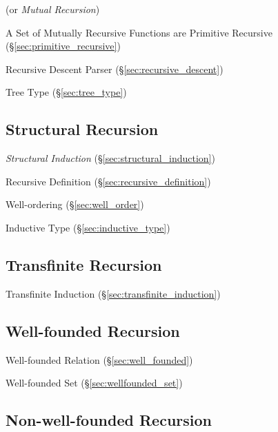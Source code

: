 (or \emph{Mutual Recursion})

A Set of Mutually Recursive Functions are Primitive Recursive
(\S\ref{sec:primitive_recursive})

Recursive Descent Parser (\S\ref{sec:recursive_descent})

Tree Type (\S\ref{sec:tree_type})



\subsection{Structural Recursion}\label{sec:structural_recursion}

\emph{Structural Induction} (\S\ref{sec:structural_induction})

Recursive Definition (\S\ref{sec:recursive_definition})

Well-ordering (\S\ref{sec:well_order})

Inductive Type (\S\ref{sec:inductive_type})



\subsection{Transfinite Recursion}\label{sec:transfinite_recursion}

Transfinite Induction (\S\ref{sec:transfinite_induction})



\subsection{Well-founded Recursion}\label{sec:wellfounded_recursion}

Well-founded Relation (\S\ref{sec:well_founded})

Well-founded Set (\S\ref{sec:wellfounded_set})



\subsection{Non-well-founded Recursion}
\label{sec:nonwellfounded_recursion}


